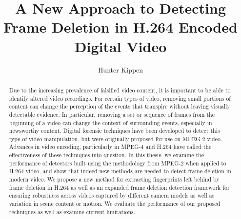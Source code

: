 \documentclass[subfig,blackref,approvalform]{drexel-thesis}
\author{Hunter Kippen}
\title{A New Approach to Detecting Frame Deletion in H.264 Encoded Digital Video}
\begin{document}
\begin{DUTpreamble} %



\tableofcontents
\listoftables
\listoffigures

\begin{abstract}

Due to the increasing prevalence of falsified video content, it is important to be able to identify altered video recordings. For certain types of video, removing small portions of content can change the perception of the events that transpire without leaving visually detectable evidence. In particular, removing a set or sequence of frames from the beginning of a video can change the context of surrounding events, especially in newsworthy content. Digital forensic techniques have been developed to detect this type of video manipulation, but were originally proposed for use on MPEG-2 video. Advances in video encoding, particularly in MPEG-4 and H.264 have called the effectiveness of these techniques into question. In this thesis, we examine the performance of detectors built using the methodology from MPEG-2 when applied to H.264 video, and show that indeed new methods are needed to detect frame deletion in modern video. We propose a new method for extracting fingerprints left behind by frame deletion in H.264 as well as an expanded frame deletion detection framework for ensuring robustness across videos captured by different camera models as well as variation in scene content or motion. We evaluate the performance of our proposed techniques as well as examine current limitations.

\end{abstract}
\end{DUTpreamble}

\begin{thesis}






\end{thesis}

\printbibliography
%

%

\end{document}
